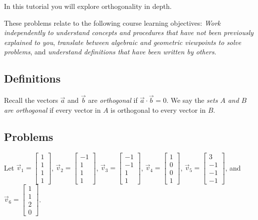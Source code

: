 \documentclass[red]{tutorial}
\newcommand{\mat}[1]{\begin{bmatrix}#1\end{bmatrix}}
\theoremstyle{definition}
\theoremstyle{theorem}
\begin{document}
	\begin{tutorial}

		\begin{objectives}
	In this tutorial you will explore orthogonality in depth.

	These problems relate to the following course learning objectives:
	\textit{Work independently to understand concepts and procedures that have not been previously
		explained to you},
		\textit{translate between algebraic and geometric viewpoints to solve problems}, and 
		\textit{understand definitions that have been written by others}.
		\end{objectives}

		\vspace{-.4cm}
\subsection*{Definitions}
		Recall the vectors $\vec a$ and $\vec b$ are \emph{orthogonal} if $\vec a\cdot \vec b=0$. 
		We say the \emph{sets $A$ and $B$ are orthogonal} if every vector in $A$ is orthogonal to every
		vector in $B$.

		\vspace{-.4cm}
\subsection*{Problems}
Let $\vec v_1=\mat{1\\1\\1\\1}$, 
		$\vec v_2=\mat{-1\\1\\1\\1}$,
		$\vec v_3=\mat{-1\\-1\\1\\1}$,
		$\vec v_4=\mat{1\\0\\0\\1}$,
		$\vec v_5=\mat{3\\-1\\-1\\-1}$, and
		$\vec v_6=\mat{1\\1\\2\\0}$.


\end{tutorial}
\end{document}
